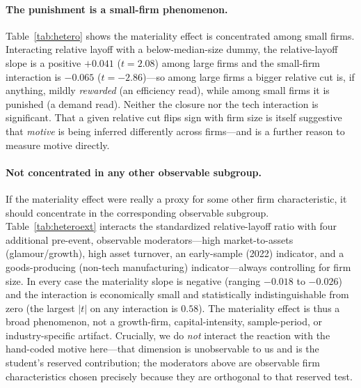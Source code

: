 \documentclass[12pt]{article}
\begin{document}
\paragraph{The punishment is a small-firm phenomenon.} Table~\ref{tab:hetero}
shows the materiality effect is concentrated among small firms. Interacting
relative layoff with a below-median-size dummy, the relative-layoff slope is a
positive $+0.041$ ($t=2.08$) among large firms and the small-firm interaction is
$-0.065$ ($t=-2.86$)---so among large firms a bigger relative cut is, if anything,
mildly \emph{rewarded} (an efficiency read), while among small firms it is
punished (a demand read). Neither the closure nor the tech interaction is
significant. That a given relative cut flips sign with firm size is itself
suggestive that \emph{motive} is being inferred differently across firms---and is
a further reason to measure motive directly.

\paragraph{Not concentrated in any other observable subgroup.} If the materiality
effect were really a proxy for some other firm characteristic, it should
concentrate in the corresponding observable subgroup. Table~\ref{tab:heteroext}
interacts the standardized relative-layoff ratio with four additional pre-event,
observable moderators---high market-to-assets (glamour/growth), high asset
turnover, an early-sample (2022) indicator, and a goods-producing (non-tech
manufacturing) indicator---always controlling for firm size. In every case the
materiality slope is negative (ranging $-0.018$ to $-0.026$) and the interaction is
economically small and statistically indistinguishable from zero (the largest
$|t|$ on any interaction is $0.58$). The materiality effect is thus a broad
phenomenon, not a growth-firm, capital-intensity, sample-period, or
industry-specific artifact. Crucially, we do \emph{not} interact the reaction with
the hand-coded motive here---that dimension is unobservable to us and is the
student's reserved contribution; the moderators above are observable firm
characteristics chosen precisely because they are orthogonal to that reserved test.
\end{document}
